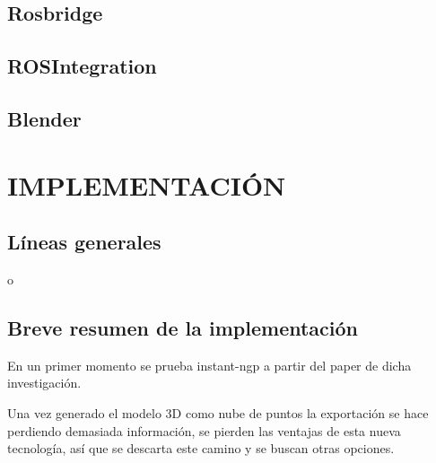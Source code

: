 \documentclass[a4paper, 12pt, spanish, twoside]{article}
\begin{document}
\subsection{Rosbridge} 
\label{sec:herramientas:rosbridge}


\subsection{ROSIntegration} \label{sec:herramientas:rosintegration}


\subsection{Blender} \label{sec:herramientas:blender}


\clearpage





\newpage
\section{IMPLEMENTACIÓN} \label{sec:implementacion}

\subsection{Líneas generales} 

o

\subsection{Breve resumen de la implementación} 

En un primer momento se prueba \gls{instant-ngp} a partir del paper de dicha investigación. 

Una vez generado el modelo 3D como nube de puntos la exportación se hace perdiendo demasiada información, se pierden las ventajas de esta nueva tecnología, así que se descarta este camino y se buscan otras opciones. 
\end{document}
